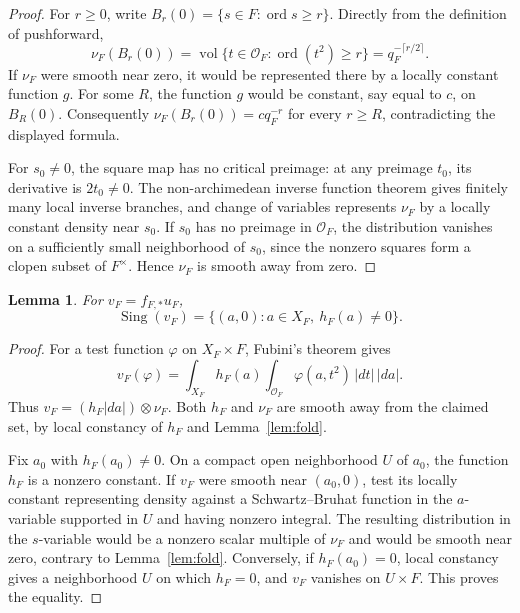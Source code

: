 \documentclass[11pt]{article}
\newtheorem{lemma}{Lemma}
\newcommand{\cO}{\mathcal O}
\newcommand{\Sing}{\operatorname{Sing}}
\begin{document}
\begin{proof}
For \(r\ge0\), write
\(B_r(0)=\{s\in F:\operatorname{ord}s\ge r\}\).  Directly from the
definition of pushforward,
\[
 \nu_F(B_r(0))
 =\operatorname{vol}\{t\in\cO_F: \operatorname{ord}(t^2)\ge r\}
 =q_F^{-\lceil r/2\rceil}.
\]
If \(\nu_F\) were smooth near zero, it would be represented there by a
locally constant function \(g\).  For some \(R\), the function \(g\) would be
constant, say equal to \(c\), on \(B_R(0)\).  Consequently
\(\nu_F(B_r(0))=c q_F^{-r}\) for every \(r\ge R\), contradicting the displayed
formula.

For \(s_0\ne0\), the square map has no critical preimage: at any preimage
\(t_0\), its derivative is \(2t_0\ne0\).  The non-archimedean inverse function
theorem gives finitely many local inverse branches, and change of variables
represents \(\nu_F\) by a locally constant density near \(s_0\).  If \(s_0\)
has no preimage in \(\cO_F\), the distribution vanishes on a sufficiently
small neighborhood of \(s_0\), since the nonzero squares form a clopen subset
of \(F^\times\).  Hence \(\nu_F\) is smooth away from zero.
\end{proof}

\begin{lemma}\label{lem:sing}
For \(v_F=f_{F,*}u_F\),
\[
  \Sing(v_F)=\{(a,0):a\in X_F,\ h_F(a)\ne0\}.
\]
\end{lemma}

\begin{proof}
For a test function \(\varphi\) on \(X_F\times F\), Fubini's theorem gives
\[
 v_F(\varphi)
 =\int_{X_F}h_F(a)\int_{\cO_F}\varphi(a,t^2)\,|dt|\,|da|.
\]
Thus \(v_F=(h_F|da|)\otimes\nu_F\).  Both \(h_F\) and \(\nu_F\) are smooth
away from the claimed set, by local constancy of \(h_F\) and
Lemma~\ref{lem:fold}.

Fix \(a_0\) with \(h_F(a_0)\ne0\).  On a compact open neighborhood \(U\) of
\(a_0\), the function \(h_F\) is a nonzero constant.  If \(v_F\) were smooth
near \((a_0,0)\), test its locally constant representing density against a
Schwartz--Bruhat function in the \(a\)-variable supported in \(U\) and having
nonzero integral.  The resulting distribution in the \(s\)-variable would be
a nonzero scalar multiple of \(\nu_F\) and would be smooth near zero,
contrary to Lemma~\ref{lem:fold}.  Conversely, if \(h_F(a_0)=0\), local
constancy gives a neighborhood \(U\) on which \(h_F=0\), and \(v_F\) vanishes
on \(U\times F\).  This proves the equality.
\end{proof}
\end{document}
